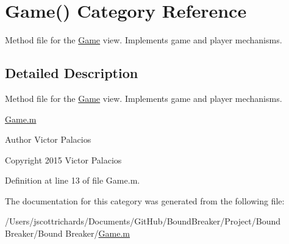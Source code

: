 \hypertarget{category_game_07_08}{}\section{Game() Category Reference}
\label{category_game_07_08}


Method file for the \hyperlink{interface_game}{Game} view. Implements game and player mechanisms.  




\subsection{Detailed Description}
Method file for the \hyperlink{interface_game}{Game} view. Implements game and player mechanisms. 

\hyperlink{_game_8m}{Game.\+m}

\begin{DoxyAuthor}{Author}
Victor Palacios 
\end{DoxyAuthor}
\begin{DoxyCopyright}{Copyright}
2015 Victor Palacios 
\end{DoxyCopyright}


Definition at line 13 of file Game.\+m.



The documentation for this category was generated from the following file\+:\begin{DoxyCompactItemize}
\item 
/\+Users/jscottrichards/\+Documents/\+Git\+Hub/\+Bound\+Breaker/\+Project/\+Bound Breaker/\+Bound Breaker/\hyperlink{_game_8m}{Game.\+m}\end{DoxyCompactItemize}
